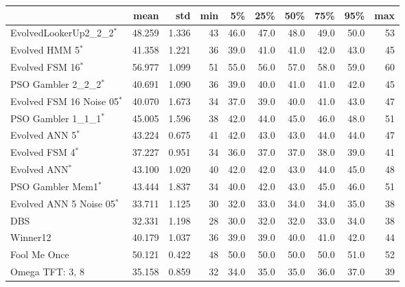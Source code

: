 \begin{tabular}{lrrrrrrrrr}
\toprule
{} &    mean &    std &  min &    5\% &   25\% &   50\% &   75\% &   95\% &  max \\
\midrule
EvolvedLookerUp2\_2\_2$^{*}$    &  48.259 &  1.336 &   43 &  46.0 &  47.0 &  48.0 &  49.0 &  50.0 &   53 \\
Evolved HMM 5$^{*}$           &  41.358 &  1.221 &   36 &  39.0 &  41.0 &  41.0 &  42.0 &  43.0 &   45 \\
Evolved FSM 16$^{*}$          &  56.977 &  1.099 &   51 &  55.0 &  56.0 &  57.0 &  58.0 &  59.0 &   60 \\
PSO Gambler 2\_2\_2$^{*}$       &  40.691 &  1.090 &   36 &  39.0 &  40.0 &  41.0 &  41.0 &  42.0 &   45 \\
Evolved FSM 16 Noise 05$^{*}$ &  40.070 &  1.673 &   34 &  37.0 &  39.0 &  40.0 &  41.0 &  43.0 &   47 \\
PSO Gambler 1\_1\_1$^{*}$       &  45.005 &  1.596 &   38 &  42.0 &  44.0 &  45.0 &  46.0 &  48.0 &   51 \\
Evolved ANN 5$^{*}$           &  43.224 &  0.675 &   41 &  42.0 &  43.0 &  43.0 &  44.0 &  44.0 &   47 \\
Evolved FSM 4$^{*}$           &  37.227 &  0.951 &   34 &  36.0 &  37.0 &  37.0 &  38.0 &  39.0 &   41 \\
Evolved ANN$^{*}$             &  43.100 &  1.020 &   40 &  42.0 &  42.0 &  43.0 &  44.0 &  45.0 &   48 \\
PSO Gambler Mem1$^{*}$        &  43.444 &  1.837 &   34 &  40.0 &  42.0 &  43.0 &  45.0 &  46.0 &   51 \\
Evolved ANN 5 Noise 05$^{*}$  &  33.711 &  1.125 &   30 &  32.0 &  33.0 &  34.0 &  34.0 &  35.0 &   38 \\
DBS                           &  32.331 &  1.198 &   28 &  30.0 &  32.0 &  32.0 &  33.0 &  34.0 &   38 \\
Winner12                      &  40.179 &  1.037 &   36 &  39.0 &  39.0 &  40.0 &  41.0 &  42.0 &   44 \\
Fool Me Once                  &  50.121 &  0.422 &   48 &  50.0 &  50.0 &  50.0 &  50.0 &  51.0 &   52 \\
Omega TFT: 3, 8               &  35.158 &  0.859 &   32 &  34.0 &  35.0 &  35.0 &  36.0 &  37.0 &   39 \\
\bottomrule
\end{tabular}
